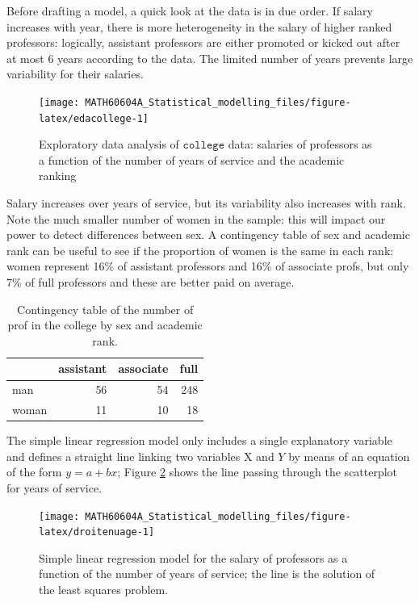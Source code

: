 \documentclass[
  11pt,
  letterpaper,
]{book}
\theoremstyle{definition}
\theoremstyle{definition}
\theoremstyle{definition}
\theoremstyle{remark}
\begin{document}
Before drafting a model, a quick look at the data is in due order. If salary increases with year, there is more heterogeneity in the salary of higher ranked professors: logically, assistant professors are either promoted or kicked out after at most 6 years according to the data. The limited number of years prevents large variability for their salaries.

\begin{figure}

{\centering \texttt{[image: MATH60604A\_Statistical\_modelling\_files/figure-latex/edacollege-1]} 

}

\caption{Exploratory data analysis of $\texttt{college}$ data: salaries of professors as a function of the number of years of service and the academic ranking}\label{fig:edacollege}
\end{figure}

Salary increases over years of service, but its variability also increases with rank. Note the much smaller number of women in the sample: this will impact our power to detect differences between sex. A contingency table of sex and academic rank can be useful to see if the proportion of women is the same in each rank: women represent 16\% of assistant professors and 16\% of associate profs, but only 7\% of full professors and these are better paid on average.

\begin{table}

\caption{\label{tab:tableaucontingence}Contingency table of the number of prof in the college by sex and academic rank.}
\centering
\begin{tabular}[t]{lrrr}
\toprule
  & assistant & associate & full\\
\midrule
man & 56 & 54 & 248\\
woman & 11 & 10 & 18\\
\bottomrule
\end{tabular}
\end{table}

The simple linear regression model only includes a single explanatory variable and defines a straight line linking two variables \(\mathrm{X}\) and \(Y\) by means of an equation of the form \(y=a+bx\); Figure \ref{fig:droitenuage} shows the line passing through the scatterplot for years of service.

\begin{figure}

{\centering \texttt{[image: MATH60604A\_Statistical\_modelling\_files/figure-latex/droitenuage-1]} 

}

\caption{Simple linear regression model for the salary of professors as a function of the number of years of service; the line is the solution of the least squares problem.}\label{fig:droitenuage}
\end{figure}
\end{document}
